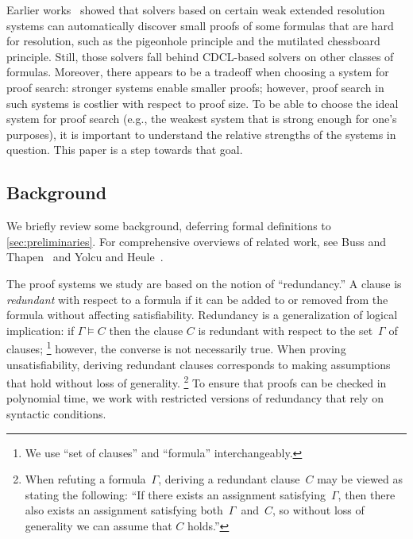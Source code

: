 \documentclass[12pt]{article}
\begin{document}
Earlier works~\cite{HKSB17,HKB19} showed that solvers based on
certain weak extended resolution systems can automatically discover
small proofs of some formulas that are hard for resolution,
such as the pigeonhole principle and the mutilated chessboard principle.
Still, those solvers fall behind CDCL-based solvers on other classes of formulas.
Moreover, there appears to be a tradeoff when choosing a system for proof search:
stronger systems enable smaller proofs;
however, proof search in such systems is costlier with respect to proof size.
To be able to choose the ideal system for proof search
(e.g., the weakest system that is strong enough for one's purposes),
it is important to understand the relative strengths of the systems in question.
This paper is a step towards that goal.

\subsection{Background}
\label{sec:background}

We briefly review some background,
deferring formal definitions to \cref{sec:preliminaries}.
For comprehensive overviews of related work,
see Buss and Thapen~\cite{BT21} and Yolcu and Heule~\cite{YH23}.

The proof systems we study are based on the notion of ``redundancy.''
A clause is \emph{redundant} with respect to a formula
if it can be added to or removed from the formula
without affecting satisfiability.
Redundancy is a generalization of logical implication:
if $\Gamma \models C$ then the clause $C$
is redundant with respect to the set~$\Gamma$ of clauses;%
\footnote{We use ``set of clauses'' and ``formula'' interchangeably.}
however, the converse is not necessarily true.
When proving unsatisfiability,
deriving redundant clauses corresponds to
making assumptions that hold without loss of generality.%
\footnote{When refuting a formula~$\Gamma$,
  deriving a redundant clause~$C$ may be viewed as stating the following:
  ``If there exists an assignment satisfying~$\Gamma$,
  then there also exists an assignment satisfying both~$\Gamma$~and~$C$,
  so without loss of generality we can assume that $C$ holds.''}
To ensure that proofs can be checked in polynomial time,
we work with restricted versions of redundancy
that rely on syntactic conditions.
\end{document}
